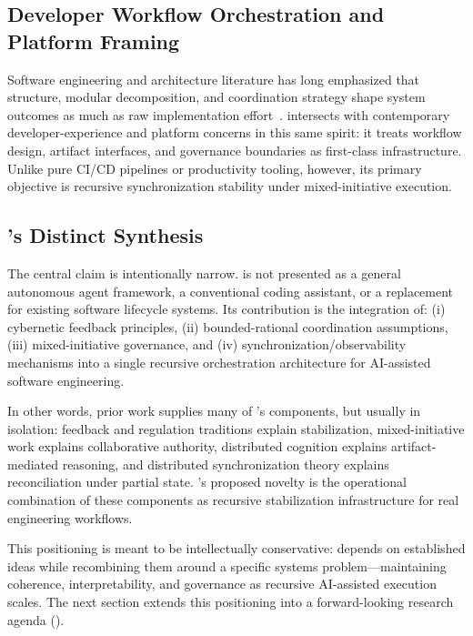 \subsection{Developer Workflow Orchestration and Platform Framing}

Software engineering and architecture literature has long emphasized that structure, modular decomposition, and coordination strategy shape system outcomes as much as raw implementation effort~\cite{Parnas1972Modularization,Brooks1987NoSilverBullet}.  intersects with contemporary developer-experience and platform concerns in this same spirit: it treats workflow design, artifact interfaces, and governance boundaries as first-class infrastructure. Unlike pure CI/CD pipelines or productivity tooling, however, its primary objective is recursive synchronization stability under mixed-initiative execution.

\subsection{'s Distinct Synthesis}

The central claim is intentionally narrow.  is not presented as a general autonomous agent framework, a conventional coding assistant, or a replacement for existing software lifecycle systems. Its contribution is the integration of: (i) cybernetic feedback principles, (ii) bounded-rational coordination assumptions, (iii) mixed-initiative governance, and (iv) synchronization/observability mechanisms into a single recursive orchestration architecture for AI-assisted software engineering.

In other words, prior work supplies many of 's components, but usually in isolation: feedback and regulation traditions explain stabilization, mixed-initiative work explains collaborative authority, distributed cognition explains artifact-mediated reasoning, and distributed synchronization theory explains reconciliation under partial state. 's proposed novelty is the operational combination of these components as recursive stabilization infrastructure for real engineering workflows.

This positioning is meant to be intellectually conservative:  depends on established ideas while recombining them around a specific systems problem---maintaining coherence, interpretability, and governance as recursive AI-assisted execution scales. The next section extends this positioning into a forward-looking research agenda ().
